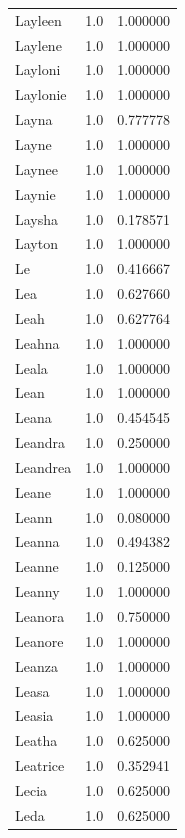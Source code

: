 \documentclass[
  letterpaper,
  DIV=11,
  numbers=noendperiod]{scrreprt}
\begin{document}
\begin{tabular}{lrr}
Layleen         &   1.0 &   1.000000 \\
Laylene         &   1.0 &   1.000000 \\
Layloni         &   1.0 &   1.000000 \\
Laylonie        &   1.0 &   1.000000 \\
Layna           &   1.0 &   0.777778 \\
Layne           &   1.0 &   1.000000 \\
Laynee          &   1.0 &   1.000000 \\
Laynie          &   1.0 &   1.000000 \\
Laysha          &   1.0 &   0.178571 \\
Layton          &   1.0 &   1.000000 \\
Le              &   1.0 &   0.416667 \\
Lea             &   1.0 &   0.627660 \\
Leah            &   1.0 &   0.627764 \\
Leahna          &   1.0 &   1.000000 \\
Leala           &   1.0 &   1.000000 \\
Lean            &   1.0 &   1.000000 \\
Leana           &   1.0 &   0.454545 \\
Leandra         &   1.0 &   0.250000 \\
Leandrea        &   1.0 &   1.000000 \\
Leane           &   1.0 &   1.000000 \\
Leann           &   1.0 &   0.080000 \\
Leanna          &   1.0 &   0.494382 \\
Leanne          &   1.0 &   0.125000 \\
Leanny          &   1.0 &   1.000000 \\
Leanora         &   1.0 &   0.750000 \\
Leanore         &   1.0 &   1.000000 \\
Leanza          &   1.0 &   1.000000 \\
Leasa           &   1.0 &   1.000000 \\
Leasia          &   1.0 &   1.000000 \\
Leatha          &   1.0 &   0.625000 \\
Leatrice        &   1.0 &   0.352941 \\
Lecia           &   1.0 &   0.625000 \\
Leda            &   1.0 &   0.625000 \\

\end{tabular}
\end{document}
